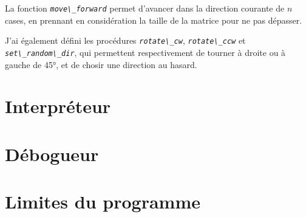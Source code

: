 \documentclass[a4paper,11pt]{article}
\newcommand{\code}[1]{{\textit{\lstinline{#1}}}}
\begin{document}
La fonction \code{move\_forward} permet d'avancer dans la direction courante de $n$ cases, en prennant en considération la taille de la matrice pour ne pas dépasser.

J'ai également défini les procédures \code{rotate\_cw}, \code{rotate\_ccw} et \code{set\_random\_dir}, qui permettent respectivement de tourner à droite ou à gauche de 45°, et de chosir une direction au hasard.


\section*{Interpréteur}



\section*{Débogueur}


\section*{Limites du programme}
\end{document}
